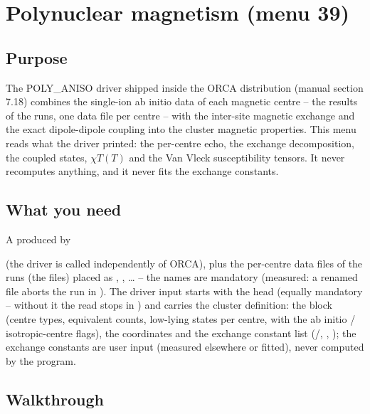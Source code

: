 \chapter{Polynuclear magnetism (menu 39)}
\label{ch:menu39}

\section{Purpose}

The POLY\_ANISO driver shipped inside the ORCA distribution (manual
section 7.18) combines the single-ion ab initio data of each magnetic
centre -- the  results of the 
runs, one data file per centre -- with the inter-site magnetic exchange and
the exact dipole-dipole coupling into the cluster magnetic properties.
This menu reads what the driver printed: the per-centre echo, the exchange
decomposition, the coupled states, $\chi T(T)$ and the Van Vleck
susceptibility tensors.  It never recomputes anything, and it never fits
the exchange constants.

\section{What you need}

A  produced by

\begin{quote}
\end{quote}

(the driver is called independently of ORCA), plus the per-centre data
files of the  runs (the
 files) placed as
, ,
\ldots{} -- the names are mandatory (measured: a renamed file aborts the
run in ).  The driver input starts with the
 head (equally mandatory -- without it the read stops
in ) and carries the cluster definition: the 
block (centre types, equivalent counts, low-lying states per centre, with
the ab initio / isotropic-centre flags), the  coordinates and
the exchange constant list (/, ,
); the exchange constants are user input (measured elsewhere or
fitted), never computed by the program.

\section{Walkthrough}

